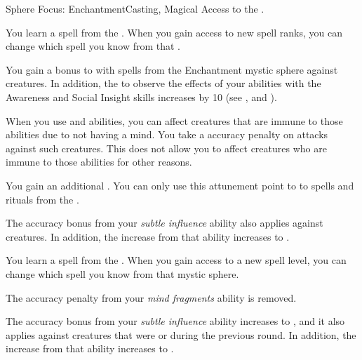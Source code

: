     \begin{feat}{Sphere Focus: Enchantment}{Casting, Magical}
        \featpre Access to the  .

         You learn a spell from the  .
        When you gain access to new spell ranks, you can change which spell you know from that .

         You gain a  bonus to  with spells from the Enchantment mystic sphere against \unaware creatures.
        In addition, the  to observe the effects of your  abilities with the Awareness and Social Insight skills increases by 10 (see , and ).

         When you use  and  abilities, you can affect creatures that are immune to those abilities due to not having a mind.
        You take a  accuracy penalty on attacks against such creatures.
        This does not allow you to affect creatures who are immune to those abilities for other reasons.

         You gain an additional .
        You can only use this attunement point to  to spells and rituals from the  .

         The accuracy bonus from your \textit{subtle influence} ability also applies against \partiallyunaware creatures.
        In addition, the  increase from that ability increases to .

         You learn a spell from the  .
        When you gain access to a new spell level, you can change which spell you know from that mystic sphere.

         The accuracy penalty from your \textit{mind fragments} ability is removed.

         The accuracy bonus from your \textit{subtle influence} ability increases to , and it also applies against creatures that were \unaware or \partiallyunaware during the previous round.
        In addition, the  increase from that ability increases to .
    \end{feat}

